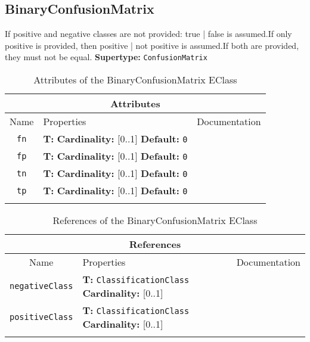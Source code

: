 \documentclass{article}
\begin{document}
\subsection[BinaryConfusionMatrix]{BinaryConfusionMatrix}
\label{e4smBinaryConfusionMatrix}

If positive and negative classes are not provided: true | false is assumed.If only positive is provided, then positive | not positive is assumed.If both are provided, they must not be equal.
\textbf{Supertype: }\texttt{ConfusionMatrix}
\begin{table}[H]
\footnotesize
\begin{tabularx}{\textwidth}{|c| p{4 cm} | X |}
\hline
\multicolumn{3}{|c|}{\textbf{Attributes}} \\
\hline
Name & Properties & Documentation \\ \hline \hline
\texttt{fn}
 & 
\textbf{T:} \texttt{}
\newline
\textbf{Cardinality:} [0..1]
\newline
\textbf{Default:} \texttt{0}
 & \\ \hline
\texttt{fp}
 & 
\textbf{T:} \texttt{}
\newline
\textbf{Cardinality:} [0..1]
\newline
\textbf{Default:} \texttt{0}
 & \\ \hline
\texttt{tn}
 & 
\textbf{T:} \texttt{}
\newline
\textbf{Cardinality:} [0..1]
\newline
\textbf{Default:} \texttt{0}
 & \\ \hline
\texttt{tp}
 & 
\textbf{T:} \texttt{}
\newline
\textbf{Cardinality:} [0..1]
\newline
\textbf{Default:} \texttt{0}
 & \\ \hline
\caption{Attributes of the BinaryConfusionMatrix EClass}
\end{tabularx}
\label{e4smBinaryConfusionMatrixattr}
\end{table}
\begin{table}[H]
\footnotesize
\begin{tabularx}{\textwidth}{|c| p{4 cm} | X |}
\hline
\multicolumn{3}{|c|}{\textbf{References}} \\
\hline
Name & Properties & Documentation \\ \hline \hline
\texttt{negativeClass}
 & 
\textbf{T:} \texttt{ClassificationClass}
\newline
\textbf{Cardinality:} [0..1]
 & \\ \hline
\texttt{positiveClass}
 & 
\textbf{T:} \texttt{ClassificationClass}
\newline
\textbf{Cardinality:} [0..1]
 & \\ \hline
\caption{References of the BinaryConfusionMatrix EClass}
\end{tabularx}
\label{e4smBinaryConfusionMatrixref}
\end{table}
\end{document}
